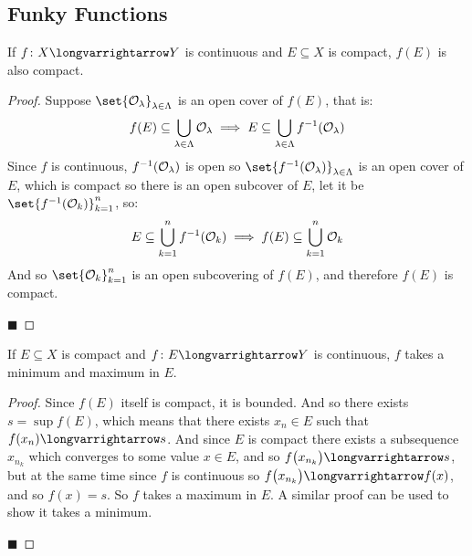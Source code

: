 \documentclass[10pt]{article}
\def\openset{{\cal O}}
\begin{document}


\bigskip

\subsection{Funky Functions}

\begin{prop*}

    If $f\colon X\longvarrightarrow Y$ is continuous and $E\subseteq X$ is compact, $f(E)$ is also compact.

\end{prop*}

\begin{proof}

    Suppose $\set{\openset_\lambda}_{\lambda\in\Lambda}$ is an open cover of $f(E)$, that is:
    \[ f(E) \subseteq \bigcup_{\lambda\in\Lambda}\openset_\lambda \implies E \subseteq \bigcup_{\lambda\in\Lambda} f^{-1}(\openset_\lambda) \]
    Since $f$ is continuous, $f^{-1}(\openset_\lambda)$ is open so $\set{f^{-1}(\openset_\lambda)}_{\lambda\in\Lambda}$ is an open cover of $E$, which is compact so there is an open subcover of $E$, let
    it be $\set{f^{-1}(\openset_k)}_{k=1}^n$, so:
    \[ E \subseteq \bigcup_{k=1}^n f^{-1}(\openset_k) \implies f(E) \subseteq \bigcup_{k=1}^n\openset_k \]
    And so $\set{\openset_k}_{k=1}^n$ is an open subcovering of $f(E)$, and therefore $f(E)$ is compact.

    \hfill$\blacksquare$

\end{proof}

\begin{prop*}

    If $E\subseteq X$ is compact and $f\colon E\longvarrightarrow Y$ is continuous, $f$ takes a minimum and maximum in $E$.

\end{prop*}

\begin{proof}

    Since $f(E)$ itself is compact, it is bounded.
    And so there exists $s=\sup f(E)$, which means that there exists $x_n\in E$ such that $f(x_n)\longvarrightarrow s$.
    And since $E$ is compact there exists a subsequence $x_{n_k}$ which converges to some value $x\in E$, and so $f\bigl(x_{n_k}\bigr)\longvarrightarrow s$, but at the same time since $f$ is continuous
    so $f\bigl(x_{n_k}\bigr)\longvarrightarrow f(x)$, and so $f(x)=s$.
    So $f$ takes a maximum in $E$.
    A similar proof can be used to show it takes a minimum.

    \hfill$\blacksquare$

\end{proof}
\end{document}
